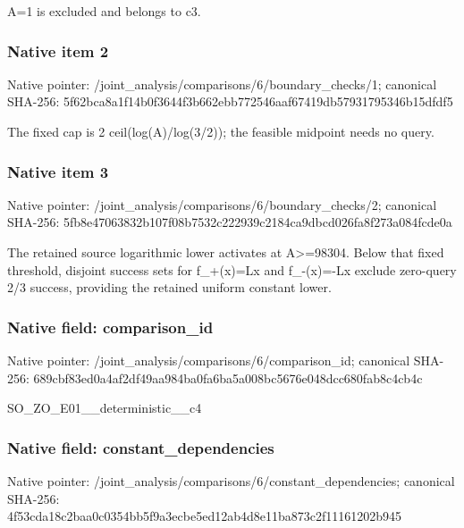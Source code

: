 \documentclass[10pt,a4paper]{article}
\begin{document}
\begingroup\raggedright\sloppy A=\allowbreak{}1 is excluded and belongs to c3.\par\endgroup

\subsubsection{Native item 2}
Native pointer: /joint\_\allowbreak{}analysis/comparisons/6/boundary\_\allowbreak{}checks/1; canonical SHA-256: 5f62bca8a1f14b0f3644f3b662ebb772546aaf67419db57931795346b15dfdf5

\begingroup\raggedright\sloppy The fixed cap is 2 ceil(log(A)/\allowbreak{}log(3/\allowbreak{}2));\allowbreak{} the feasible midpoint needs no query.\par\endgroup

\subsubsection{Native item 3}
Native pointer: /joint\_\allowbreak{}analysis/comparisons/6/boundary\_\allowbreak{}checks/2; canonical SHA-256: 5fb8e47063832b107f08b7532c222939c2184ca9dbcd026fa8f273a084fcde0a

\begingroup\raggedright\sloppy The retained source logarithmic lower activates at A>=\allowbreak{}98304. Below that fixed threshold,\allowbreak{} disjoint success sets for f\_\allowbreak{}+(x)=\allowbreak{}Lx and f\_\allowbreak{}-(x)=\allowbreak{}-Lx exclude zero-query 2/\allowbreak{}3 success,\allowbreak{} providing the retained uniform constant lower.\par\endgroup

\subsubsection{Native field: comparison\_\allowbreak{}id}
Native pointer: /joint\_\allowbreak{}analysis/comparisons/6/comparison\_\allowbreak{}id; canonical SHA-256: 689cbf83ed0a4af2df49aa984ba0fa6ba5a008bc5676e048dcc680fab8c4cb4c

\begingroup\raggedright\sloppy SO\_\allowbreak{}ZO\_\allowbreak{}E01\_\allowbreak{}\_\allowbreak{}deterministic\_\allowbreak{}\_\allowbreak{}c4\par\endgroup

\subsubsection{Native field: constant\_\allowbreak{}dependencies}
Native pointer: /joint\_\allowbreak{}analysis/comparisons/6/constant\_\allowbreak{}dependencies; canonical SHA-256: 4f53cda18c2baa0c0354bb5f9a3ecbe5ed12ab4d8e11ba873c2f11161202b945
\end{document}
